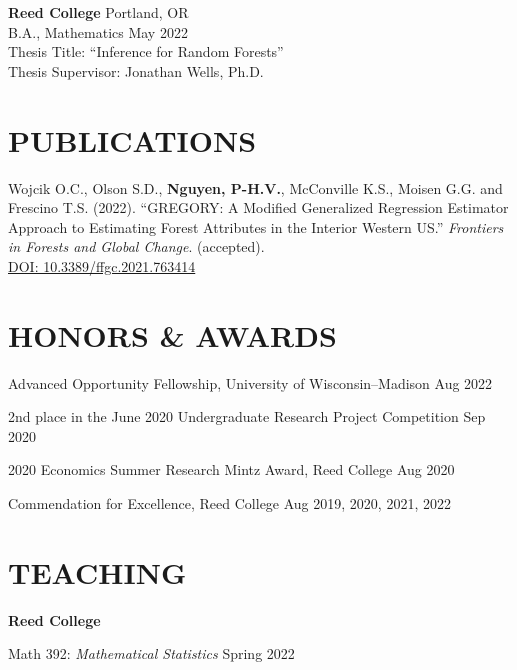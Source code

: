 \documentclass[margin]{res}
\def\pvn{\textbf{Nguyen, P-H.V.}}
\begin{document}
\begin{resume}
                {\bf Reed College} \hfill Portland, OR \\
                B.A., Mathematics \hfill May 2022 \\
                Thesis Title: ``Inference for Random Forests'' \\
                Thesis Supervisor: Jonathan Wells, Ph.D.
  
  


\section{PUBLICATIONS}

Wojcik O.C., Olson S.D., \pvn, McConville K.S., Moisen G.G. and Frescino T.S. (2022). ``GREGORY: A Modified Generalized Regression Estimator Approach to Estimating Forest Attributes in the Interior Western US.'' \textit{Frontiers in Forests and Global Change}. (accepted). \\ \href{https://doi.org/10.3389/ffgc.2021.763414}{DOI: 10.3389/ffgc.2021.763414}



\section{HONORS \& AWARDS} 

Advanced Opportunity Fellowship, University of Wisconsin--Madison \hfill Aug 2022

2nd place in the June 2020 Undergraduate Research Project Competition \hfill Sep 2020

2020 Economics Summer Research Mintz Award, Reed College \hfill Aug 2020

Commendation for Excellence, Reed College \hfill Aug 2019, 2020, 2021, 2022

\section{TEACHING}

\textbf{Reed College} 

Math 392: {\it Mathematical Statistics} \hfill Spring 2022


\end{resume}
\end{document}
